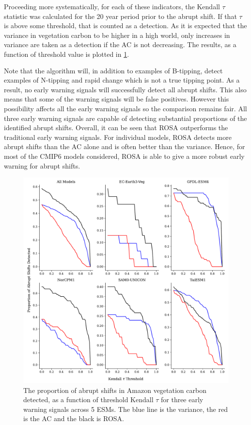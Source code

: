 Proceeding more systematically, for each of these indicators, the Kendall $\tau$ statistic was calculated for the
20 year period prior to the abrupt shift. If that $\tau$ is above some threshold, that is counted 
as a detection. As it is expected that the variance in vegetation carbon to be higher 
in a high  world, only increases in variance are taken as a detection if
the AC is not decreasing. The results, as a function of threshold value
is plotted in \cref{fig:complex_test}.

Note that the algorithm will, in addition to examples of B-tipping, detect examples
of N-tipping and rapid change which is not a true tipping point. As a result, no 
early warning signals will successfully detect all abrupt shifts. This also means that some
of the warning signals will be false positives. However this possibility
affects all the early warning signals so the comparison remains fair. All three early warning signals are capable
of detecting substantial proportions of the identified abrupt shifts. Overall, it can be seen that ROSA outperforms the traditional early warning signals.
For individual models,
ROSA detects more abrupt shifts than the AC alone and is often better than the 
variance. Hence, for most of the CMIP6 models considered, ROSA is able to give a more robust
early warning for abrupt shifts.

\begin{figure}
\includegraphics[width=\textwidth,keepaspectratio]{figure4}
\caption[ROSA in CMIP6]{The proportion of abrupt shifts in Amazon vegetation carbon
detected, as a function of threshold Kendall $\tau$ for three early warning signals across 5 ESMs. The blue line is the variance,
the red is the AC and the black is ROSA.}\label{fig:complex_test}
\end{figure}



